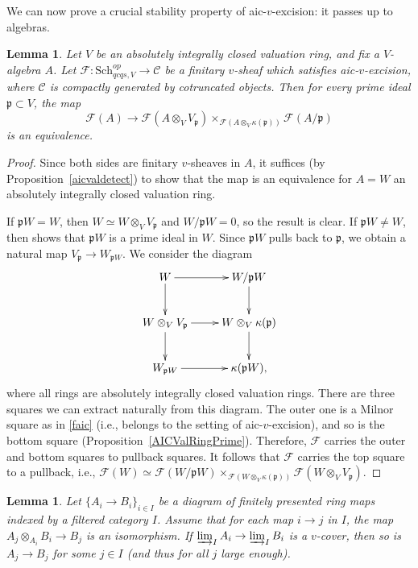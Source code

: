 \documentclass[reqno]{amsart}
\newtheorem{lemma}[theorem]{Lemma}
\theoremstyle{definition}
\begin{document}
We can now prove a crucial stability property of aic-$v$-excision: it passes up to algebras. 

\begin{lemma} 
\label{excifaicexciv}
Let $V$ be an absolutely integrally closed valuation ring, and fix a
$V$-algebra $A$. 
Let $\mathcal{F}\colon  \mathrm{Sch}_{qcqs,V}^{op} \to \mathcal{C}$ be a finitary
$v$-sheaf  which satisfies aic-$v$-excision, where $\mathcal{C}$ is compactly generated by cotruncated objects. Then for every 
prime ideal $\mathfrak{p} \subset V$, the map
\[ \mathcal{F}( A) \to \mathcal{F}( A \otimes_V V_{\mathfrak{p}})
\times_{\mathcal{F}( A \otimes_V \kappa(\mathfrak{p}))}\mathcal{F}( A/\mathfrak{p})\]
 is an equivalence. 
\end{lemma} 
\begin{proof} 
Since both sides are finitary $v$-sheaves in $A$, it suffices (by Proposition~\ref{aicvaldetect}) to show that  the map is an equivalence for $A = W $ an absolutely integrally closed valuation ring. 

If $\mathfrak{p} W  = W$, then $W \simeq W \otimes_V V_{\mathfrak{p}}$ and
$W/\mathfrak{p}W = 0$, so the result is clear.  If $\mathfrak{p} W \neq W$,
then  shows that $\mathfrak{p} W$ is a prime ideal  in $W$.  Since $\mathfrak{p} W$ pulls back to $\mathfrak{p}$, we obtain a natural map $V_\mathfrak{p} \to W_{\mathfrak{p}W}$.  We consider the diagram
\[ \xymatrix{
W \ar[d]  \ar[r] &  W/\mathfrak{p}W \ar[d] \\
W \otimes_V V_{\mathfrak{p}} \ar[r] \ar[d]  &  W \otimes_V \kappa( \mathfrak{p}) \ar[d]  \\
W_{\mathfrak{p}W} \ar[r] &   \kappa( \mathfrak{p} W),
}\]
where all rings are absolutely integrally closed valuation rings. 
There are three squares we can extract naturally from this diagram. 
The outer one is a Milnor square as in \eqref{faic} (i.e., belongs to the
setting of aic-$v$-excision), and so is the
bottom square (Proposition~\ref{AICValRingPrime}). 
Therefore, $\mathcal{F}$ carries the outer and bottom squares to  pullback
squares. It follows that $\mathcal{F}$ carries the top square to a  pullback,
i.e., $\mathcal{F}(W) \simeq \mathcal{F}( W/\mathfrak{p}W) \times_{\mathcal{F}( W \otimes_V
\kappa( \mathfrak{p}))} \mathcal{F}( W \otimes_V V_{\mathfrak{p}})$. 
\end{proof} 


\begin{lemma} 
\label{Descinvlimv}
Let $\{A_i \to B_i\}_{i \in I}$ be a diagram of finitely presented ring maps indexed by a filtered category $I$. Assume that for each map $i \to j$ in $I$, the map $A_j \otimes_{A_i} B_i \to B_j$ is an isomorphism.  If $\varinjlim_I A_i \to \varinjlim_I B_i$ is a   $v$-cover, then so is $A_j \to B_j$ for some $j \in I$ (and thus for all $j$  large enough). 
\end{lemma} 
\end{document}
